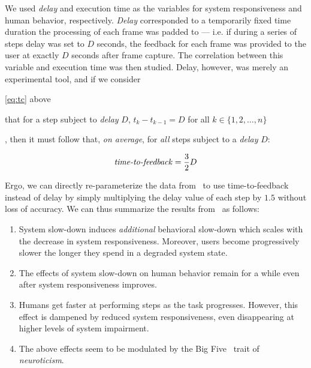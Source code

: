 We used \emph{delay} and execution time as the variables for system responsiveness and human behavior, respectively.
\emph{Delay} corresponded to a temporarily fixed time duration the processing of each frame was padded to --- i.e. if during a series of steps delay was set to \( D \) seconds, the feedback for each frame was provided to the user at exactly \( D \) seconds after frame capture.
The correlation between this variable and execution time was then studied.
Delay, however, was merely an experimental tool, and if we consider
\begin{enumerate*}[itemjoin={{; }}, itemjoin={{; and }}]
    \item \cref{eq:tc} above
    \item that for a step subject to \emph{delay} \( D \), \( t_k - t_{k - 1} = D \) for all \( k \in \{1, 2, \ldots, n\} \)
\end{enumerate*},
then it must follow that, \emph{on average}, for \emph{all} steps subject to a \emph{delay} \( D \):

\begin{equation}\label{eq:ttf}
    \text{\emph{time-to-feedback}} = \frac{3}{2}D
\end{equation}

Ergo, we can directly re-parameterize the data from~\cite{olguinmunoz:impact2021} to use time-to-feedback instead of delay by simply multiplying the delay value of each step by \( 1.5 \) without loss of accuracy.
We can thus summarize the results from~\cite{olguinmunoz:impact2021} as follows:

\begin{enumerate}
    \item System slow-down induces \emph{additional} behavioral slow-down which scales with the decrease in system responsiveness.
    Moreover, users become progressively slower the longer they spend in a degraded system state.

    \item The effects of system slow-down on human behavior remain for a while even after system responsiveness improves.
    
    \item Humans get faster at performing steps as the task progresses. However, this effect is dampened by reduced system responsiveness, even disappearing at higher levels of system impairment.
    
    \item The above effects seem to be modulated by the Big Five~\cite{oliver:bfi1999} trait of \emph{neuroticism}.
\end{enumerate}

